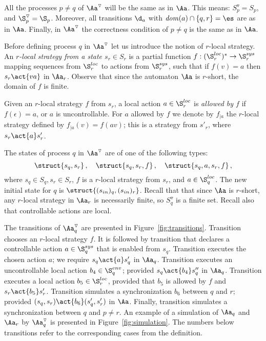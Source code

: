 \documentclass[10pt,a4paper]{article}
\newcommand*\circled[1]{\tikz[baseline=(char.base)]{
            \node[shape=circle,draw,inner sep=1pt] (char) {\small #1};}}
\newcommand{\red}[1]{#1^\triangledown}
\newcommand{\Sloc}{\S^{loc}}
\newcommand{\loc}{\mathit{dom}}
\newcommand{\Ssys}{\S^{sys}}
\newcommand{\Senv}{\S^{env}}
\begin{document}
All the processes $p\not=q$ of $\red\Aa$ will be the same as in
$\Aa$. This means: $\red{S_p}=S_p$, and $\red\S_p=\S_p$. Moreover, all
transitions $\d_a$ with $\loc(a) \cap \{q,r\}=\es$ are as in
$\Aa$. Finally, in $\red\Aa$ the  correctness condition of $p\not=q$
is the same as in $\Aa$.

Before defining process $q$ in $\red\Aa$ let us introduce the notion
of $r$-local strategy. An \emph{$r$-local strategy from a state
  $s_r\in S_r$} is a partial function $f:(\Sloc_r)^*\to\Ssys_r$
mapping sequences from $\Sloc_r$ to actions from $\Ssys_r$, such that
if $f(v)=a$ then $s_r \act{va}$ in $\Aa_r$.  Observe that since the
automaton $\Aa$ is $r$-short, the domain of $f$ is finite.

Given an $r$-local strategy $f$ from $s_r$, a local action $a \in
\Sloc_r$ is \emph{allowed by $f$}
if $f(\epsilon)=a$, or $a$ is uncontrollable. For $a$ allowed by $f$
 we
denote by $f_{|a}$ the $r$-local strategy defined by
$f_{|a}(v)=f(av)$; this is a strategy from $s'_r$, where $s_r \act{a}
s'_r$. 






The states of process $q$ in $\red\Aa$ are of one of the following types:
\begin{equation*}
\struct{s_q,s_r}\,,\quad \struct{s_q,s_r,f}\,,\quad  \struct{s_q,a,s_r,f}  \,,
\end{equation*}
where $s_q \in S_q, s_r\in S_r$, $f$ is a $r$-local strategy from $s_r$,
and $a\in\Sloc_q$. The new initial state for $q$ is 
$\struct{(s_{in})_q,(s_{in})_r}$. 
Recall that that since $\Aa$ is $r$-short, any $r$-local strategy in $\Aa_r$ is
necessarily finite, so $\red S_q$ is a finite set. Recall also
  that controllable actions are local.

The transitions of $\red\Aa_q$ are presented in
Figure~\ref{fig:transitions}. Transition \circled{$1$} chooses an
$r$-local strategy $f$. It is followed by transition \circled{$2$}
that declares a controllable action $a\in\Ssys_q$ that is enabled from
$s_q$. Transition \circled{$3$} executes the chosen action $a$; we
require $s_q\act{a} s'_q$ in $\Aa_q$. Transition \circled{$4$}
executes an uncontrollable local action $b_4\in\Senv_q$; provided
$s_q\act{b_4} s''_q$ in $\Aa_q$. Transition \circled{$5$} executes a local action
$b_5\in\Sloc_r$, provided that $b_5$ is allowed by $f$ and $s_r\act{b_5} s'_r$.
Transition \circled{$6$} simulates a synchronization $b_6$ between $q$ and
$r$; provided $(s_q,s_r)\act{b_6}(s'_q,s'_r)$ in $\Aa$. Finally, transition \circled{$7$} simulates a synchronization
between $q$ and $p\not=r$. An example of a simulation of $\Aa_q$ and
$\Aa_r$ by $\red\Aa_q$ is presented in
Figure~\ref{fig:simulation}. The numbers below transitions refer to
the corresponding cases from the definition. 
\end{document}
